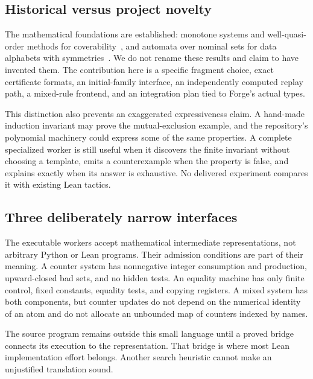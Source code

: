 \subsection{Historical versus project novelty}
The mathematical foundations are established: monotone systems and
well-quasi-order methods for coverability~\cite{abdulla,finkel}, and automata
over nominal sets for data alphabets with symmetries~\cite{nominal}. We do not
rename these results and claim to have invented them. The contribution here is
a specific fragment choice, exact certificate formats, an initial-family
interface, an independently computed replay path, a mixed-rule frontend, and
an integration plan tied to Forge's actual types.

This distinction also prevents an exaggerated expressiveness claim. A hand-made
induction invariant may prove the mutual-exclusion example, and the repository's
polynomial machinery could express some of the same properties. A complete
specialized worker is still useful when it discovers the finite invariant
without choosing a template, emits a counterexample when the property is false,
and explains exactly when its answer is exhaustive. No delivered experiment
compares it with existing Lean tactics.

\subsection{Three deliberately narrow interfaces}
The executable workers accept mathematical intermediate representations, not
arbitrary Python or Lean programs. Their admission conditions are part of their
meaning. A counter system has nonnegative integer consumption and production,
upward-closed bad sets, and no hidden tests. An equality machine has only finite
control, fixed constants, equality tests, and copying registers. A mixed system
has both components, but counter updates do not depend on the numerical identity
of an atom and do not allocate an unbounded map of counters indexed by names.

The source program remains outside this small language until a proved bridge
connects its execution to the representation. That bridge is where most Lean
implementation effort belongs. Another search heuristic cannot make an
unjustified translation sound.
